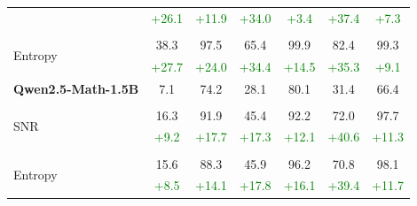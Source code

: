 \begin{table}[b!]
\begin{center}
\begin{tabular}{lcccccc}
  &\textcolor{green}{+26.1}& \textcolor{green}{+11.9}   &\textcolor{green}{+34.0}& \textcolor{green}{+3.4} &\textcolor{green}{+37.4}& \textcolor{green}{+7.3}   \\
 \\
\multirow{2}{*}{Entropy}    &38.3& 97.5 &65.4& 99.9  &82.4 & 99.3\\
  &\textcolor{green}{+27.7}& \textcolor{green}{+24.0} &\textcolor{green}{+34.4}&  \textcolor{green}{+14.5} &\textcolor{green}{+35.3}&  \textcolor{green}{+9.1}\\
\midrule
\textbf{Qwen2.5-Math-1.5B}  & 7.1& 74.2 & 28.1 & 80.1 &31.4 & 66.4\\
\\
\multirow{2}{*}{SNR}  &16.3 & 91.9& 45.4& 92.2& 72.0 & 97.7\\
 &\textcolor{green}{+9.2}& \textcolor{green}{+17.7} &\textcolor{green}{+17.3}& \textcolor{green}{+12.1} &\textcolor{green}{+40.6}& \textcolor{green}{+11.3} \\
 \\
\multirow{2}{*}{Entropy} &15.6  & 88.3 &45.9& 96.2 &70.8& 98.1\\
  &\textcolor{green}{+8.5}& \textcolor{green}{+14.1}&\textcolor{green}{+17.8}& \textcolor{green}{+16.1} &\textcolor{green}{+39.4}& \textcolor{green}{+11.7}\\
\bottomrule
\end{tabular}
\end{center}
\end{table}
\normalsize


